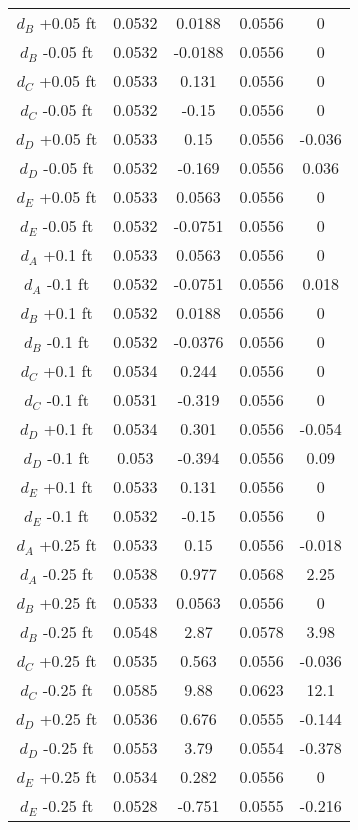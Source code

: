 \begin{spacing}{1.0}
\begin{center}
\begin{longtable}{ccccc}
			$d_{B} $ +0.05 ft & 0.0532 & 0.0188 & 0.0556 & 0 \\
			$d_{B} $ -0.05 ft & 0.0532 & -0.0188 & 0.0556 & 0 \\
			$d_{C} $ +0.05 ft & 0.0533 & 0.131 & 0.0556 & 0 \\
			$d_{C} $ -0.05 ft & 0.0532 & -0.15 & 0.0556 & 0 \\
			$d_{D} $ +0.05 ft & 0.0533 & 0.15 & 0.0556 & -0.036 \\
			$d_{D} $ -0.05 ft & 0.0532 & -0.169 & 0.0556 & 0.036 \\
			$d_{E} $ +0.05 ft & 0.0533 & 0.0563 & 0.0556 & 0 \\
			$d_{E} $ -0.05 ft & 0.0532 & -0.0751 & 0.0556 & 0 \\
			$d_{A} $ +0.1 ft & 0.0533 & 0.0563 & 0.0556 & 0 \\
			$d_{A} $ -0.1 ft & 0.0532 & -0.0751 & 0.0556 & 0.018 \\
			$d_{B} $ +0.1 ft & 0.0532 & 0.0188 & 0.0556 & 0 \\
			$d_{B} $ -0.1 ft & 0.0532 & -0.0376 & 0.0556 & 0 \\
			$d_{C} $ +0.1 ft & 0.0534 & 0.244 & 0.0556 & 0 \\
			$d_{C} $ -0.1 ft & 0.0531 & -0.319 & 0.0556 & 0 \\
			$d_{D} $ +0.1 ft & 0.0534 & 0.301 & 0.0556 & -0.054 \\
			$d_{D} $ -0.1 ft & 0.053 & -0.394 & 0.0556 & 0.09 \\
			$d_{E} $ +0.1 ft & 0.0533 & 0.131 & 0.0556 & 0 \\
			$d_{E} $ -0.1 ft & 0.0532 & -0.15 & 0.0556 & 0 \\
			$d_{A} $ +0.25 ft & 0.0533 & 0.15 & 0.0556 & -0.018 \\
			$d_{A} $ -0.25 ft & 0.0538 & 0.977 & 0.0568 & 2.25 \\
			$d_{B} $ +0.25 ft & 0.0533 & 0.0563 & 0.0556 & 0 \\
			$d_{B} $ -0.25 ft & 0.0548 & 2.87 & 0.0578 & 3.98 \\
			$d_{C} $ +0.25 ft & 0.0535 & 0.563 & 0.0556 & -0.036 \\
			$d_{C} $ -0.25 ft & 0.0585 & 9.88 & 0.0623 & 12.1 \\
			$d_{D} $ +0.25 ft & 0.0536 & 0.676 & 0.0555 & -0.144 \\
			$d_{D} $ -0.25 ft & 0.0553 & 3.79 & 0.0554 & -0.378 \\
			$d_{E} $ +0.25 ft & 0.0534 & 0.282 & 0.0556 & 0 \\
			$d_{E} $ -0.25 ft & 0.0528 & -0.751 & 0.0555 & -0.216 \\
			\bottomrule
		\end{longtable}%
	\end{center}
\end{spacing}

